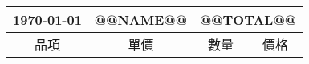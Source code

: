 \begin{tabular}{ |c|c|c|c|}\hline
\AdvanceDate[
0%
]\today  & { @@NAME@@} & \multicolumn{2}{c|}{\large @@TOTAL@@} \\\hline
  品項&單價&數量&價格\\\hline
\end{tabular}